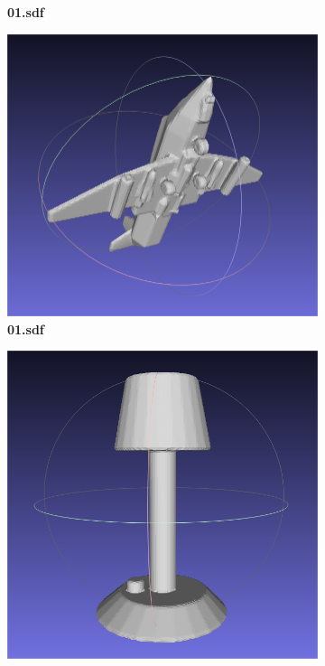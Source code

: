 \documentclass{ctexart}
\begin{document}
\begin{figure}[htbp]
\begin{subfigure}[htbp]{0.3\linewidth}
        \caption{\textbf{01.sdf}}
    \end{subfigure}
    \begin{subfigure}[htbp]{0.3\linewidth}
        \centering
        \includegraphics[width=0.9\linewidth]{figures/1_3.png}
        \caption{\textbf{01.sdf}}
    \end{subfigure}
    \begin{subfigure}[htbp]{0.3\linewidth}
        \centering
        \includegraphics[width=0.9\linewidth]{figures/2_1.png}

\end{subfigure}
\end{figure}
\end{document}
